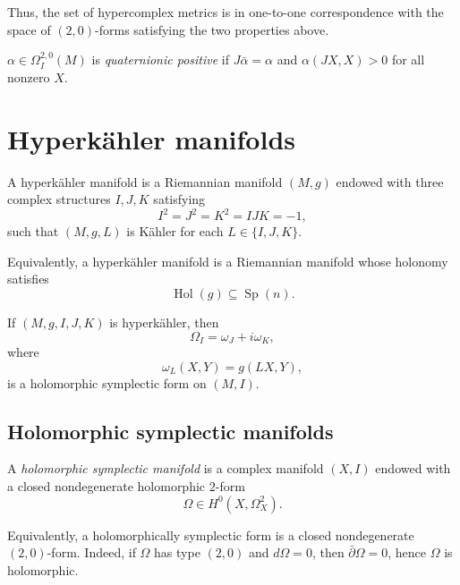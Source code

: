 \noindent
Thus, the set of hypercomplex metrics
is in one-to-one correspondence with
the space of $(2,0)$-forms satisfying
the two properties above.

\begin{definition}
\label{definition-quaternionic-positive}
$\alpha \in \Omega^{2,0}_I(M)$
is {\it quaternionic positive} 
if $J \bar{\alpha}=\alpha$
and $\alpha(JX,X)>0$
for all nonzero $X$.
\end{definition}

\section{Hyperkähler manifolds}
\label{section-hyperkahler-manifolds}

\begin{definition}
A hyperkähler manifold is a Riemannian 
manifold
$(M,g)$ endowed with three complex structures
$I,J,K$ satisfying
$$
I^2=J^2=K^2=IJK=-1,
$$
such that $(M,g,L)$ is Kähler for each
$L \in \{I,J,K\}$.
\end{definition}

\begin{remark}
Equivalently, a hyperkähler manifold is a
Riemannian manifold whose holonomy satisfies
$$
\operatorname{Hol}(g)\subseteq \operatorname{Sp}(n).
$$
\end{remark}

\begin{remark}
If $(M,g,I,J,K)$ is hyperkähler, then
$$
\Omega_I=\omega_J+i\omega_K,
$$
where
$$
\omega_L(X,Y)=g(LX,Y),
$$
is a holomorphic symplectic form on $(M,I)$.
\end{remark}

\subsection{Holomorphic symplectic manifolds}
\label{subsection-holomorphic-symplectic}

\begin{definition}
A {\it holomorphic symplectic manifold} is a 
complex
manifold $(X,I)$ endowed with a closed
nondegenerate holomorphic $2$-form
$$
\Omega \in H^0(X,\Omega_X^2).
$$
\end{definition}

\noindent
Equivalently, a holomorphically symplectic
form is a closed nondegenerate
$(2,0)$-form. Indeed, if $\Omega$ has type
$(2,0)$ and $d\Omega=0$, then
$\bar\partial\Omega=0$, hence $\Omega$ is
holomorphic.

